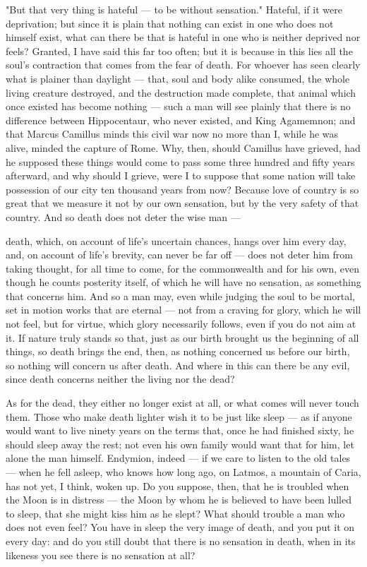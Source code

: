  "But that very thing is hateful — to be without sensation." Hateful, if it were deprivation; but since it is plain that nothing can exist in one who does not himself exist, what can there be that is hateful in one who is neither deprived nor feels? Granted, I have said this far too often; but it is because in this lies all the soul's contraction that comes from the fear of death. For whoever has seen clearly what is plainer than daylight — that, soul and body alike consumed, the whole living creature destroyed, and the destruction made complete, that animal which once existed has become nothing — such a man will see plainly that there is no difference between Hippocentaur, who never existed, and King Agamemnon; and that Marcus Camillus minds this civil war now no more than I, while he was alive, minded the capture of Rome. Why, then, should Camillus have grieved, had he supposed these things would come to pass some three hundred and fifty years afterward, and why should I grieve, were I to suppose that some nation will take possession of our city ten thousand years from now? Because love of country is so great that we measure it not by our own sensation, but by the very safety of that country. And so death does not deter the wise man —

 death, which, on account of life's uncertain chances, hangs over him every day, and, on account of life's brevity, can never be far off — does not deter him from taking thought, for all time to come, for the commonwealth and for his own, even though he counts posterity itself, of which he will have no sensation, as something that concerns him. And so a man may, even while judging the soul to be mortal, set in motion works that are eternal — not from a craving for glory, which he will not feel, but for virtue, which glory necessarily follows, even if you do not aim at it. If nature truly stands so that, just as our birth brought us the beginning of all things, so death brings the end, then, as nothing concerned us before our birth, so nothing will concern us after death. And where in this can there be any evil, since death concerns neither the living nor the dead?

 As for the dead, they either no longer exist at all, or what comes will never touch them. Those who make death lighter wish it to be just like sleep — as if anyone would want to live ninety years on the terms that, once he had finished sixty, he should sleep away the rest; not even his own family would want that for him, let alone the man himself. Endymion, indeed — if we care to listen to the old tales — when he fell asleep, who knows how long ago, on Latmos, a mountain of Caria, has not yet, I think, woken up. Do you suppose, then, that he is troubled when the Moon is in distress — the Moon by whom he is believed to have been lulled to sleep, that she might kiss him as he slept? What should trouble a man who does not even feel? You have in sleep the very image of death, and you put it on every day: and do you still doubt that there is no sensation in death, when in its likeness you see there is no sensation at all?

